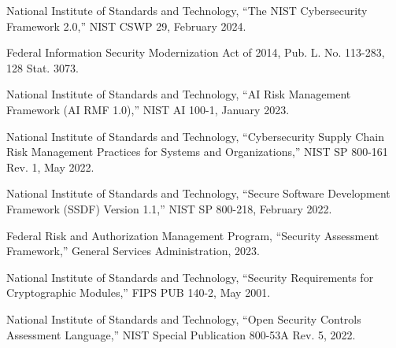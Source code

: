 \documentclass[11pt,letterpaper]{article}
\begin{document}

\begin{thebibliography}{99}


National Institute of Standards and Technology, ``The NIST Cybersecurity Framework 2.0,'' NIST CSWP 29, February 2024.

Federal Information Security Modernization Act of 2014, Pub. L. No. 113-283, 128 Stat. 3073.

National Institute of Standards and Technology, ``AI Risk Management Framework (AI RMF 1.0),'' NIST AI 100-1, January 2023.

National Institute of Standards and Technology, ``Cybersecurity Supply Chain Risk Management Practices for Systems and Organizations,'' NIST SP 800-161 Rev. 1, May 2022.

National Institute of Standards and Technology, ``Secure Software Development Framework (SSDF) Version 1.1,'' NIST SP 800-218, February 2022.

Federal Risk and Authorization Management Program, ``Security Assessment Framework,'' General Services Administration, 2023.

National Institute of Standards and Technology, ``Security Requirements for Cryptographic Modules,'' FIPS PUB 140-2, May 2001.

National Institute of Standards and Technology, ``Open Security Controls Assessment Language,'' NIST Special Publication 800-53A Rev. 5, 2022.

\end{thebibliography}
\end{document}
